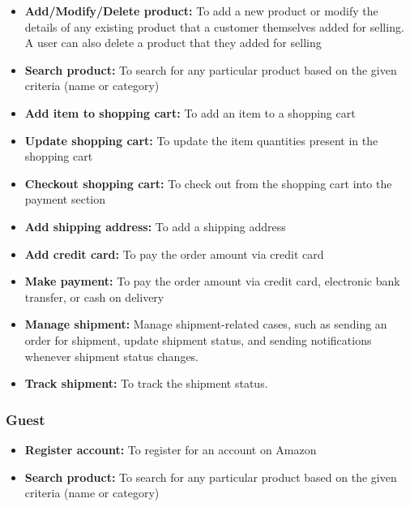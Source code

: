 \begin{itemize}
\item
\protect{}\label{wX4yX2JAc2RF4KIpQMpzL}
\textbf{Add/Modify/Delete product:} To add a new product or modify the details of any existing product that a customer themselves added for selling. A user can also delete a product that they added for selling
\item
\protect{}\label{3Oi8XVjbIjkkXOg4a7GYA}
\textbf{Search product:} To search for any particular product based on the given criteria (name or category)
\item
\protect{}\label{d-jM7UgvCzxWd_0-BgqUA}
\textbf{Add item to shopping cart:} To add an item to a shopping cart
\item
\protect{}\label{kvX6wDFEVkvqATGNcim3a}
\textbf{Update shopping cart:} To update the item quantities present in the shopping cart
\item
\protect{}\label{IBOKOkrmzgL9R_Qmwa9N0}
\textbf{Checkout shopping cart:} To check out from the shopping cart into the payment section
\item
\protect{}\label{mMRxb0x69jDczrtq2fO-v}
\textbf{Add shipping address:} To add a shipping address
\item
\protect{}\label{eZBbQYxKOYs8ZyWrFEPM_}
\textbf{Add credit card:} To pay the order amount via credit card
\item
\protect{}\label{OdZ8rHooBV2HLnAp6eF6E}
\textbf{Make payment:} To pay the order amount via credit card, electronic bank transfer, or cash on delivery
\item
\protect{}\label{8OvCufJfuPf_PSKrOQV_d}
\textbf{Manage shipment:} Manage shipment-related cases, such as sending an order for shipment, update shipment status, and sending notifications whenever shipment status changes.
\item
\protect{}\label{UxrtC719bUdokvIiOPyBh}
\textbf{Track shipment:} To track the shipment status.
\end{itemize}

\subsubsection{Guest}\label{GPfxcY6P0Kl8oR8BbThmz}

\begin{itemize}
\item
\protect{}\label{aX51j-gIuCs9apxgithVW}
\textbf{Register account:} To register for an account on Amazon
\item
\protect{}\label{jC703kZufzPSHrXolCI1m}
\textbf{Search product:} To search for any particular product based on the given criteria (name or category)
\end{itemize}

